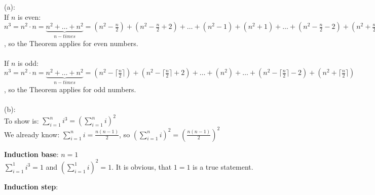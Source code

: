 
\label{ex:section1-2:8}
(a): \\
If $n$ is even: $n^3 = n^2\cdot n = \underbrace{n^2 + \ldots + n^2}_{n-times} = (n^2-\frac{n}{2}) + (n^2-\frac{n}{2}+2) + \ldots + (n^2-1) + (n^2+1) + \ldots + (n^2-\frac{n}{2}-2) + (n^2 + \frac{n}{2})$, so the Theorem applies for even numbers. \\ \\
If $n$ is odd: $n^3 = n^2\cdot n = \underbrace{n^2 + \ldots + n^2}_{n-times} = (n^2-\lceil\frac{n}{2}\rceil) + (n^2-\lceil\frac{n}{2}\rceil+2) + \ldots + (n^2) + \ldots + (n^2-\lceil\frac{n}{2}\rceil-2) + (n^2 + \lceil\frac{n}{2}\rceil)$, so the Theorem applies for odd numbers. \\ \\

(b): \\
To show is: $\sum_{i = 1}^n i^3 = \left(\sum_{i=1}^{n} i \right)^2$ \\
We already know: $\sum_{i=1}^{n} i = \frac{n(n-1)}{2}$, so $\left(\sum_{i=1}^{n} i \right)^2 = \left( \frac{n(n-1)}{2}\right)^2$

\textbf{Induction base}: $n = 1$ \\
$\sum_{i = 1}^1 i^3 = 1$ and $\left(\sum_{i = 1}^1 i\right)^2 = 1$.
It is obvious, that $1=1$ is a true statement.


\textbf{Induction step}:
